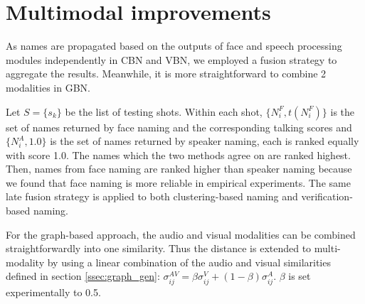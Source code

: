 \section{Multimodal improvements}
\label{sec:naming}

As names are propagated based on the outputs of face and speech processing modules independently in CBN and VBN, we employed a fusion strategy to aggregate the results. Meanwhile, it is more straightforward to combine 2 modalities in GBN.

 Let $S = \{s_k\}$ be the list of testing shots. Within each shot, $\{N^F_i, t(N^F_i)\}$ is the set of names returned by face naming and the corresponding talking scores and $\{N^A_i, 1.0\}$  is the set of names returned by speaker naming, each is ranked equally with score 1.0.
%
The names which the two methods agree on are ranked highest. 
%
Then, names from face naming are ranked higher than speaker naming  because we found that face naming is more reliable in empirical experiments.
%
%
The same late fusion strategy is applied to both clustering-based naming and verification-based naming.

 For the graph-based approach, the audio and visual modalities can be combined straightforwardly into one similarity.
%
Thus the distance is extended to multi-modality by using a linear combination of the audio and visual similarities defined in section \ref{ssec:graph_gen}: $\sigma^{AV}_{ij} = \beta \sigma^V_{ij} + (1-\beta) \sigma^A_{ij}$. $\beta$ is set experimentally to 0.5.

\endinput

\begin{algorithm}
  \caption{Ranking names within shots
    \label{algo:ranking}}
  \begin{algorithmic}[1]
	  \For{$s_k \in S$}
 	  	    \State{$Q_{s_k} = \emptyset$}
		    \State{Face\_naming$(s_k) \Rightarrow (N^F_i, t(N^F_i))$}
				\State{Speaker\_naming$(s_k) \Rightarrow (N^A_j, 1.0)$}
				\For{each $N^F_i$}
					\If{$\exists N^A_j / N^A_j = N^F_i$}
						\State{$Q_{s_k} = Q_{s_k} \cup \{(N^F_i, t(N^F_i) + 2.0)\}$}
					\Else
						\State{$Q_{s_k} = Q_{s_k} \cup \{(N^F_i, t(N^F_i) + 1.0)\}$}
					\EndIf
				\EndFor
				\For{each $N^A_j$}
					\If{not $\exists N^F_i / N^F_i = N^A_j$}
						\State{$Q_{s_k} = Q_{s_k} \cup \{(N^A_j, 1.0)\}$}
					\EndIf
				\EndFor
		\EndFor
  \end{algorithmic}
\end{algorithm}
%